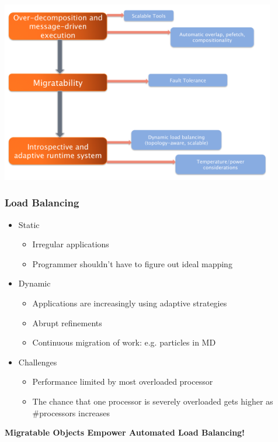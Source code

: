 \begin{frame}[fragile]
\includegraphics[width=0.9\textwidth]{figures/charmOutline.png}
\end{frame}

\begin{frame}[fragile]
\frametitle{Load Balancing}
\begin{itemize}
 \item Static
   \begin{itemize}
   \item Irregular applications
   \item Programmer shouldn't have to figure out ideal mapping
   \end{itemize}
 \item Dynamic
   \begin{itemize}
   \item Applications are increasingly using adaptive strategies
   \item Abrupt refinements
   \item Continuous migration of work: e.g. particles in MD
   \end{itemize}
 \item Challenges
   \begin{itemize}
   \item Performance limited by most overloaded processor
   \item The chance that one processor is severely overloaded gets higher as
     \#processors increases
   \end{itemize}
\end{itemize}
\begin{center}\textbf{Migratable Objects Empower Automated Load Balancing!}\end{center}
\end{frame}


